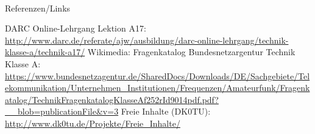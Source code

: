 \renewcommand{\refname}{Referenzen}

\hypertarget{refs}{}
\textcolor{white}{} \\ %
\Large Referenzen/Links
\footnotesize

\begin{thebibliography}{}
      DARC Online-Lehrgang Lektion A17:
                    \url{http://www.darc.de/referate/ajw/ausbildung/darc-online-lehrgang/technik-klasse-a/technik-a17/}
     	Wikimedia:
	   Fragenkatalog Bundesnetzargentur Technik Klasse A:                   
                    \url{https://www.bundesnetzagentur.de/SharedDocs/Downloads/DE/Sachgebiete/Telekommunikation/Unternehmen_Institutionen/Frequenzen/Amateurfunk/Fragenkatalog/TechnikFragenkatalogKlasseAf252rId9014pdf.pdf?__blob=publicationFile&v=3}
        Freie Inhalte (DK0TU):
                    \url{http://www.dk0tu.de/Projekte/Freie_Inhalte/}
\end{thebibliography} 


